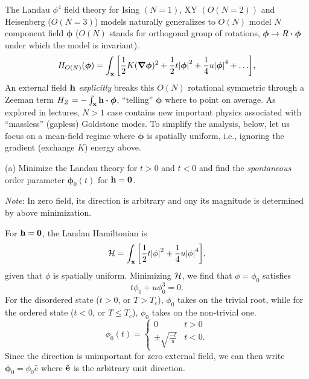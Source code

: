\documentclass[12pt]{article}
\begin{document}
\begin{problem}{4}

The Landau $\phi^4$ field theory for Ising $(N=1)$, XY $(O(N=2))$ and 
Heisenberg ($O(N=3)$) models naturally generalizes to $O(N)$ model $N$ component
field $\bm\phi$ ($O(N)$ stands for orthogonal group of rotations, $\bm\phi\to
R\vdot\bm\phi$ under which the model is invariant).
\begin{equation}
    H_{O(N)}(\bm\phi)=\int_{\vb{x}}\qty[\frac12K(\grad\bm\phi)^2+\frac12t\abs{\bm\phi}^2+\frac14u\abs{\bm\phi}^4+\hdots], 
\end{equation}
An external field $\vb{h}$ \textit{explicitly} breaks this $O(N)$ rotational
symmetric through a Zeeman term $H_Z=-\int_{\vb{x}}\vb{h}\vdot\bm\phi$,
``telling'' $\bm\phi$ where to point on average. As explored in lectures, $N>1$
case contains new important physics associated with ``massless'' (gapless)
Goldstone modes. To simplify the analysis, below, let us focus on a mean-field
regime where $\bm\phi$ is spatially uniform, i.e., ignoring the gradient
(exchange $K$) energy above.

(a) Minimize the Landau theory for $t>0$ and $t<0$ and find the
\textit{spontaneous} order parameter $\bm\phi_0(t)$ for $\vb{h}=\vb{0}$.

\textit{Note}: In zero field, its direction is arbitrary and ony its magnitude
is determined by above minimization.
\begin{solution}
For $\vb{h}=\vb{0}$, the Landau Hamiltonian is
\begin{equation}
    \mathcal{H}=\int_{\vb{x}}\qty[\frac12t\abs{\phi}^2+\frac14u\abs{\phi}^4],
\end{equation}
given that $\phi$ is spatially uniform. Minimizing $\mathcal{H}$,
 we find that $\phi=\phi_0$ satisfies
 \begin{equation}
    t\phi_0+u\phi_0^3=0. 
 \end{equation}
For the disordered state ($t>0$, or $T>T_c$), $\phi_0$ takes on the trivial 
root, while for the ordered state ($t<0$, or $T\leq T_c$), $\phi_0$ takes on the
non-trivial one.
\begin{equation}
    \phi_0(t)=\begin{cases}
        0&t>0\\
        \pm\sqrt{\frac{-t}{u}}&t<0.
    \end{cases}
\end{equation}
Since the direction is unimportant for zero external field, we can then write
$\bm\phi_0=\phi_0\hat{e}$ where $\hat{\vb{e}}$ is the arbitrary unit direction.
\end{solution}


\end{problem}
\end{document}

